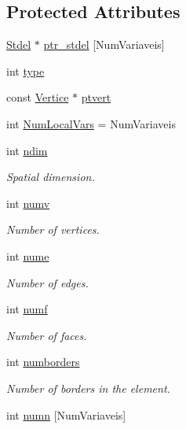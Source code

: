 \subsection*{Protected Attributes}
\begin{DoxyCompactItemize}
\item 
\hyperlink{classStdel}{Stdel} $\ast$ \hyperlink{classPhElem_a7b4509b90bcf92be76cd8fdb76d7385b}{ptr\+\_\+stdel} \mbox{[}Num\+Variaveis\mbox{]}
\item 
int \hyperlink{classPhElem_a1ed1b45136a718afef64c846fb905546}{type}
\item 
const \hyperlink{structVertice}{Vertice} $\ast$ \hyperlink{classPhElem_a92acc9f8f36991ce851df5e462425d3c}{ptvert}
\item 
int \hyperlink{classPhElem_a2ec71d768628a94d7fbe74be08a08ea9}{Num\+Local\+Vars} = Num\+Variaveis
\item 
int \hyperlink{classPhElem_af3ea3f4193f7d65855c3fabead6f2545}{ndim}
\begin{DoxyCompactList}\small\item\em Spatial dimension. \end{DoxyCompactList}\item 
int \hyperlink{classPhElem_a67ed36925b04bf0f2d177c8d31737526}{numv}
\begin{DoxyCompactList}\small\item\em Number of vertices. \end{DoxyCompactList}\item 
int \hyperlink{classPhElem_a1c0c7833feba84d4ed83d172244ca3e1}{nume}
\begin{DoxyCompactList}\small\item\em Number of edges. \end{DoxyCompactList}\item 
int \hyperlink{classPhElem_a85d9a8342adf9e155a533edf165a6fe3}{numf}
\begin{DoxyCompactList}\small\item\em Number of faces. \end{DoxyCompactList}\item 
int \hyperlink{classPhElem_ad24d6fbe02539875405dd4a6cf094284}{numborders}
\begin{DoxyCompactList}\small\item\em Number of borders in the element. \end{DoxyCompactList}\item 
int \hyperlink{classPhElem_a8e65fa4998d28b9b8db9b6fcf8999d20}{numn} \mbox{[}Num\+Variaveis\mbox{]}

\end{DoxyCompactItemize}
